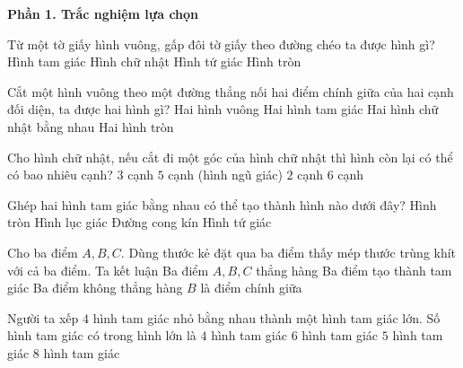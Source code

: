 \textbf{Phần 1. Trắc nghiệm lựa chọn}

\begin{ex} %
Từ một tờ giấy hình vuông, gấp đôi tờ giấy theo đường chéo ta được hình gì?
\choice
{\True Hình tam giác}
{Hình chữ nhật}
{Hình tứ giác}
{Hình tròn}
\end{ex}

\begin{ex} %
Cắt một hình vuông theo một đường thẳng nối hai điểm chính giữa của hai cạnh đối diện, ta được hai hình gì?
\choice
{Hai hình vuông}
{Hai hình tam giác}
{\True Hai hình chữ nhật bằng nhau}
{Hai hình tròn}
\end{ex}

\begin{ex} %
Cho hình chữ nhật, nếu cắt đi một góc của hình chữ nhật thì hình còn lại có thể có bao nhiêu cạnh?
\choice
{$3$ cạnh}
{\True $5$ cạnh (hình ngũ giác)}
{$2$ cạnh}
{$6$ cạnh}
\end{ex}

\begin{ex} %
Ghép hai hình tam giác bằng nhau có thể tạo thành hình nào dưới đây?
\choice
{Hình tròn}
{Hình lục giác}
{Đường cong kín}
{\True Hình tứ giác}
\end{ex}

\begin{ex} %
Cho ba điểm $A, B, C$. Dùng thước kẻ đặt qua ba điểm thấy mép thước trùng khít với cả ba điểm. Ta kết luận
\choice
{\True Ba điểm $A, B, C$ thẳng hàng}
{Ba điểm tạo thành tam giác}
{Ba điểm không thẳng hàng}
{$B$ là điểm chính giữa}
\end{ex}

\begin{ex} %
Người ta xếp $4$ hình tam giác nhỏ bằng nhau thành một hình tam giác lớn. Số hình tam giác có trong hình lớn là
\choice
{$4$ hình tam giác}
{$6$ hình tam giác}
{\True $5$ hình tam giác}
{$8$ hình tam giác}
\end{ex}

